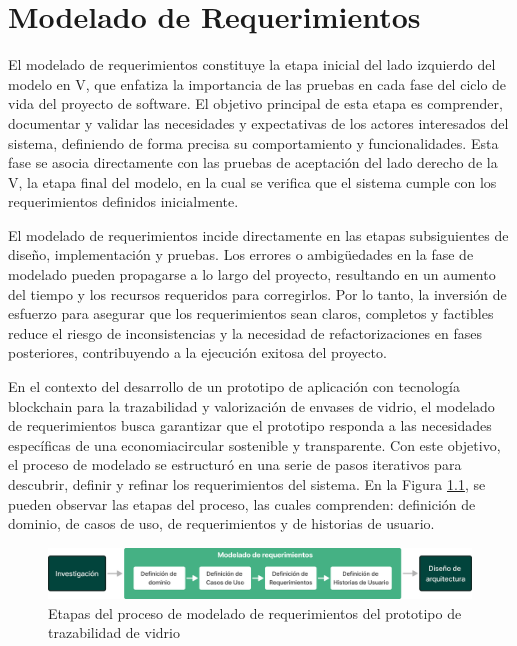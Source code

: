 \chapter[Modelado de requerimientos]{Modelado de Requerimientos}
\label{cp:modelling}

\parindent0pt

El modelado de requerimientos constituye la etapa inicial del lado izquierdo del modelo en V, que enfatiza la importancia de las pruebas en cada fase del ciclo de vida del proyecto de software. El objetivo principal de esta etapa es comprender, documentar y validar las necesidades y expectativas de los actores interesados del sistema, definiendo de forma precisa su comportamiento y funcionalidades. Esta fase se asocia directamente con las pruebas de aceptación del lado derecho de la V, la etapa final del modelo, en la cual se verifica que el sistema cumple con los requerimientos definidos inicialmente.

El modelado de requerimientos incide directamente en las etapas subsiguientes de diseño, implementación y pruebas. Los errores o ambigüedades en la fase de modelado pueden propagarse a lo largo del proyecto, resultando en un aumento del tiempo y los recursos requeridos para corregirlos. Por lo tanto, la inversión de esfuerzo para asegurar que los requerimientos sean claros, completos y factibles reduce el riesgo de inconsistencias y la necesidad de refactorizaciones en fases posteriores, contribuyendo a la ejecución exitosa del proyecto.

En el contexto del desarrollo de un prototipo de aplicación con tecnología blockchain para la trazabilidad y valorización de envases de vidrio, el modelado de requerimientos busca garantizar que el prototipo responda a las necesidades específicas de una \gls{economiacircular} sostenible y transparente. Con este objetivo, el proceso de modelado se estructuró en una serie de pasos iterativos para descubrir, definir y refinar los requerimientos del sistema. En la Figura \ref{fig:requirements-modelling-process}, se pueden observar las etapas del proceso, las cuales comprenden: definición de dominio, de casos de uso, de requerimientos y de historias de usuario.

\begin{figure}[!htb]
    \centering
    \includegraphics[width=\linewidth]{Figures/requirements-modelling.png}
    \caption{Etapas del proceso de modelado de requerimientos del prototipo de trazabilidad de vidrio}
    \label{fig:requirements-modelling-process}
\end{figure}

